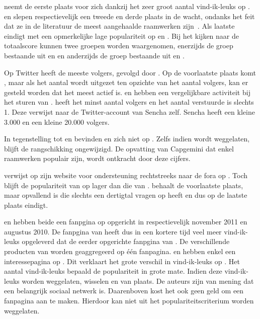 \kendo{} neemt de eerste plaats voor zich dankzij het zeer groot aantal vind-ik-leuks op \fb.
\jqm{} en \st{} slepen respectievelijk een tweede en derde plaats in de wacht, ondanks het feit dat ze in de literatuur de meest aangehaalde raamwerken zijn~\cite{David2011,Firtman2013,Hales2012,Oeflman2011}. 
Als laatste eindigt \lungo{} met een opmerkelijke lage populariteit op \so{} en \fb.
Bij het kijken naar de totaalscore kunnen twee groepen worden waargenomen, enerzijds de groep bestaande uit \kendo{} en \jqm{} en anderzijds de groep bestaande uit \st{} en \lungo{}.

Op Twitter heeft \jqm{} de meeste volgers, gevolgd door \kendo.
Op de voorlaatste plaats komt \lungo{}, maar als het aantal  wordt uitgezet ten opzichte van het aantal volgers, kan er gesteld worden dat \lungo{} het meest actief is.
\jqm{} en \kendo{} hebben een vergelijkbare activiteit bij het sturen van .
\st{} heeft het minst aantal volgers en het aantal verstuurde  is slechts 1.
Deze  verwijst naar de Twitter-account van Sencha zelf.
Sencha heeft een kleine 3.000  en een kleine 20.000 volgers.

In tegenstelling tot \jqm{} en \lungo{} bevinden \kendo{} en \st{} zich niet op \gh{}.
Zelfs indien \gh{} wordt weggelaten, blijft de rangschikking ongewijzigd.
De opvatting van Capgemini dat enkel  raamwerken populair zijn, wordt ontkracht door deze cijfers.

\kendo{} verwijst op zijn website voor ondersteuning rechtstreeks naar de fora op \so{}. 
Toch blijft de populariteit van \kendo{} op \so{} lager dan die van \jqm{}.
\st{} behaalt de voorlaatste plaats, maar opvallend is \lungo{} die slechts een dertigtal vragen op \so{} heeft en dus op de laatste plaats eindigt.

\kendo{} en \jqm{} hebben beide een fanpgina op \fb{} opgericht in respectievelijk november 2011 en augustus 2010.
De fanpgina van \kendo{} heeft dus in een kortere tijd veel meer vind-ik-leuks opgeleverd dat de eerder opgerichte fanpgina van \jqm{}.
De verschillende producten van \kendo{} worden geaggregeerd op één fanpagina. 
\st{} en \lungo{} hebben enkel een interessepagina op \fb.
Dit verklaart het grote verschil in vind-ik-leuks op \fb.
Het aantal vind-ik-leuks bepaald de populariteit in grote mate.
Indien deze vind-ik-leuks worden weggelaten, wisselen \jqm{} en \kendo{} van plaats.
De auteurs zijn van mening dat \fb{} een belangrijk sociaal netwerk is.
Daarenboven kost het ook geen geld om een fanpagina aan te maken.
Hierdoor kan \fb{} niet uit het populariteitscriterium worden weggelaten.  

